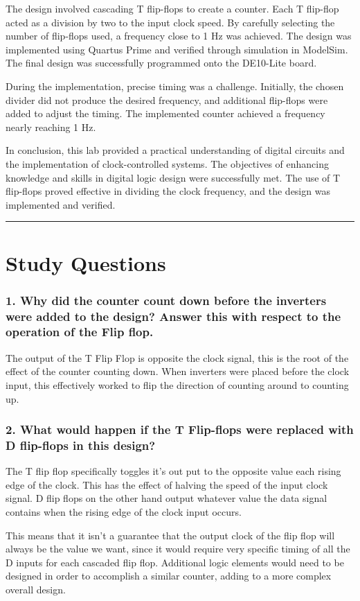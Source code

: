 \documentclass{article}
\begin{document}
The design involved cascading T flip-flops to create a counter. Each T flip-flop acted as a division by two to the input clock speed. By carefully selecting the number of flip-flops used, a frequency close to 1 Hz was achieved. The design was implemented using Quartus Prime and verified through simulation in ModelSim. The final design was successfully programmed onto the DE10-Lite board.

During the implementation, precise timing was a challenge. Initially, the chosen divider did not produce the desired frequency, and additional flip-flops were added to adjust the timing. The implemented counter achieved a frequency nearly reaching 1 Hz.

In conclusion, this lab provided a practical understanding of digital circuits and the implementation of clock-controlled systems. The objectives of enhancing knowledge and skills in digital logic design were successfully met. The use of T flip-flops proved effective in dividing the clock frequency, and the design was implemented and verified.
\vspace{5mm}
\hrule

\section*{\textcolor{mycolor}{Study Questions}}
\subsubsection*{\textcolor{mycolor}{1. Why did the counter count down before the inverters were added to the design? Answer this with respect to the operation of the Flip flop.}}
The output of the T Flip Flop is opposite the clock signal, this is the root of the effect of the counter counting down. When inverters were placed before the clock input, this effectively worked to flip the direction of counting around to counting up.
\subsubsection*{\textcolor{mycolor}{2. What would happen if the T Flip-flops were replaced with D flip-flops in this design?}}
The T flip flop specifically toggles it's out put to the opposite value each rising edge of the clock. This has the effect of halving the speed of the input clock signal. D flip flops on the other hand output whatever value the data signal contains when the rising edge of the clock input occurs.

This means that it isn't a guarantee that the output clock of the flip flop will always be the value we want, since it would require very specific timing of all the D inputs for each cascaded flip flop. Additional logic elements would need to be designed in order to accomplish a similar counter, adding to a more complex overall design.
\end{document}
